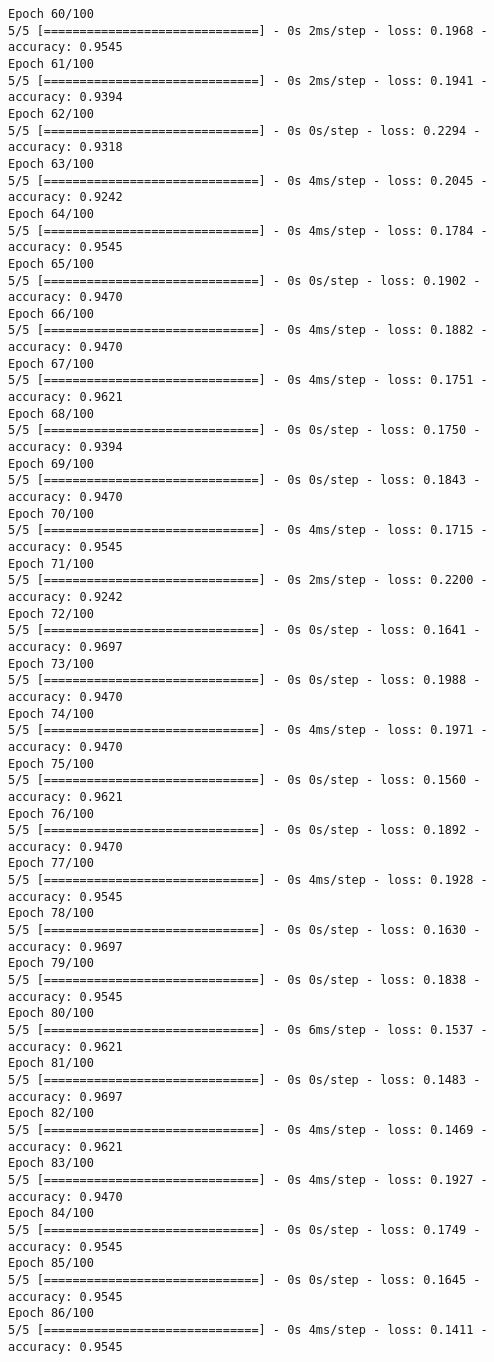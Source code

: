 \documentclass[12pt]{article}
\begin{document}
\begin{lstlisting}
Epoch 60/100
5/5 [==============================] - 0s 2ms/step - loss: 0.1968 - accuracy: 0.9545
Epoch 61/100
5/5 [==============================] - 0s 2ms/step - loss: 0.1941 - accuracy: 0.9394
Epoch 62/100
5/5 [==============================] - 0s 0s/step - loss: 0.2294 - accuracy: 0.9318
Epoch 63/100
5/5 [==============================] - 0s 4ms/step - loss: 0.2045 - accuracy: 0.9242
Epoch 64/100
5/5 [==============================] - 0s 4ms/step - loss: 0.1784 - accuracy: 0.9545
Epoch 65/100
5/5 [==============================] - 0s 0s/step - loss: 0.1902 - accuracy: 0.9470
Epoch 66/100
5/5 [==============================] - 0s 4ms/step - loss: 0.1882 - accuracy: 0.9470
Epoch 67/100
5/5 [==============================] - 0s 4ms/step - loss: 0.1751 - accuracy: 0.9621
Epoch 68/100
5/5 [==============================] - 0s 0s/step - loss: 0.1750 - accuracy: 0.9394
Epoch 69/100
5/5 [==============================] - 0s 0s/step - loss: 0.1843 - accuracy: 0.9470
Epoch 70/100
5/5 [==============================] - 0s 4ms/step - loss: 0.1715 - accuracy: 0.9545
Epoch 71/100
5/5 [==============================] - 0s 2ms/step - loss: 0.2200 - accuracy: 0.9242
Epoch 72/100
5/5 [==============================] - 0s 0s/step - loss: 0.1641 - accuracy: 0.9697
Epoch 73/100
5/5 [==============================] - 0s 0s/step - loss: 0.1988 - accuracy: 0.9470
Epoch 74/100
5/5 [==============================] - 0s 4ms/step - loss: 0.1971 - accuracy: 0.9470
Epoch 75/100
5/5 [==============================] - 0s 0s/step - loss: 0.1560 - accuracy: 0.9621
Epoch 76/100
5/5 [==============================] - 0s 0s/step - loss: 0.1892 - accuracy: 0.9470
Epoch 77/100
5/5 [==============================] - 0s 4ms/step - loss: 0.1928 - accuracy: 0.9545
Epoch 78/100
5/5 [==============================] - 0s 0s/step - loss: 0.1630 - accuracy: 0.9697
Epoch 79/100
5/5 [==============================] - 0s 0s/step - loss: 0.1838 - accuracy: 0.9545
Epoch 80/100
5/5 [==============================] - 0s 6ms/step - loss: 0.1537 - accuracy: 0.9621
Epoch 81/100
5/5 [==============================] - 0s 0s/step - loss: 0.1483 - accuracy: 0.9697
Epoch 82/100
5/5 [==============================] - 0s 4ms/step - loss: 0.1469 - accuracy: 0.9621
Epoch 83/100
5/5 [==============================] - 0s 4ms/step - loss: 0.1927 - accuracy: 0.9470
Epoch 84/100
5/5 [==============================] - 0s 0s/step - loss: 0.1749 - accuracy: 0.9545
Epoch 85/100
5/5 [==============================] - 0s 0s/step - loss: 0.1645 - accuracy: 0.9545
Epoch 86/100
5/5 [==============================] - 0s 4ms/step - loss: 0.1411 - accuracy: 0.9545

\end{lstlisting}
\end{document}
